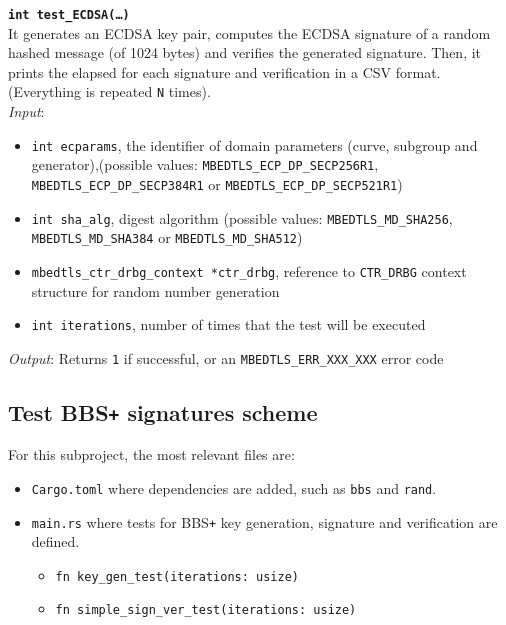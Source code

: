 \noindent
\texttt{\bfseries int test\_ECDSA(\dots)}\\
It generates an ECDSA key pair, computes the ECDSA signature of a random hashed message (of 1024 bytes) and verifies the generated signature. Then, it prints the elapsed for each signature and verification in a CSV format. (Everything is repeated \texttt{N} times). \\
\textit{Input}:
\begin{itemize}[noitemsep,nolistsep]
  \item \texttt{int ecparams}, the identifier of domain parameters (curve, subgroup and generator),(possible values: \texttt{MBEDTLS\_ECP\_DP\_SECP256R1}, \texttt{MBEDTLS\_ECP\_DP\_SECP384R1} or \texttt{MBEDTLS\_ECP\_DP\_SECP521R1})
  \item \texttt{int sha\_alg}, digest algorithm (possible values: \texttt{MBEDTLS\_MD\_SHA256}, \texttt{MBEDTLS\_MD\_SHA384} or \texttt{MBEDTLS\_MD\_SHA512})
  \item \texttt{mbedtls\_ctr\_drbg\_context *ctr\_drbg}, reference to \texttt{CTR\_DRBG} context structure for random number generation
  \item \texttt{int iterations}, number of times that the test will be executed
\end{itemize}
\textit{Output}:  Returns \texttt{1} if successful, or an \texttt{MBEDTLS\_ERR\_XXX\_XXX} error code
\newpage

\subsection{Test BBS\texttt{+} signatures scheme}
For this subproject, the most relevant files are:
\begin{itemize}
  \item \texttt{Cargo.toml} where dependencies are added, such as  
  \texttt{bbs} and \texttt{rand}. 
  \item \texttt{main.rs} where tests for BBS\texttt{+} key generation, signature and verification are defined. 
  \begin{itemize} 
    \item \texttt{fn key\_gen\_test(iterations: usize)}
    \item \texttt{fn simple\_sign\_ver\_test(iterations: usize)}
  \end{itemize}
\end{itemize}

